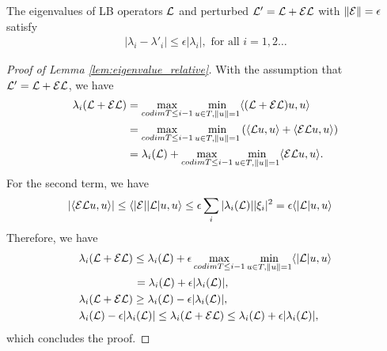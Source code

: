 \begin{lemma}\label{lem:eigenvalue_relative}
The eigenvalues of LB operators ${\mathcal L}$ and perturbed ${\mathcal L}'={\mathcal L}+{\mathcal E}{\mathcal L}$ with $\|{\mathcal E}\|= \epsilon$ satisfy
\begin{align}
    |\lambda_i-\lambda'_i|\leq \epsilon |\lambda_i|, \text{ for all }i=1,2\hdots
\end{align}
\end{lemma}
\begin{proof}[Proof of Lemma \ref{lem:eigenvalue_relative}]
With the assumption that ${\mathcal L}'={\mathcal L}+{\mathcal E}{\mathcal L}$, we have
\begin{align}
    \lambda_i({\mathcal L} + {\mathcal E}{\mathcal L})& = \max_{codim T\leq i-1} \min_{ u\in T, \|u\|=1}  \langle ({\mathcal L}+{\mathcal E}{\mathcal L}) u, u\rangle \\
    & = \max_{codim T\leq i-1} \min_{u\in T, \|u\|=1} \left(  \langle {\ensuremath{\mathcal L}} u, u\rangle   +  \langle {\ensuremath{\mathcal E}}{\ensuremath{\mathcal L}} u, u\rangle  \right)\\
    & =\lambda_i({\mathcal L}) + \max_{codim T\leq i-1} \min_{u\in T, \|u\|=1} \langle {\ensuremath{\mathcal E}}{\ensuremath{\mathcal L}} u, u\rangle.
\end{align}
For the second term, we have
\begin{align}
    |\langle {\ensuremath{\mathcal E}}{\ensuremath{\mathcal L}} u, u\rangle| &\leq \langle |{\mathcal E}|  |{\mathcal L}|u, u \rangle   \leq \epsilon \sum_i |\lambda_i({\mathcal L})||\xi_i|^2 = \epsilon \langle |{\mathcal L}| u,u \rangle
\end{align}
Therefore, we have
\begin{align}
 & \nonumber \lambda_i({\mathcal L}+{\mathcal E}{\mathcal L}) \leq \lambda_i({\mathcal L}) + \epsilon
   \max_{codim T\leq i-1} \min_{u\in T, \|u\|=1} \langle |{\mathcal L}| u, u\rangle\\
   &\qquad \qquad\quad  = \lambda_i({\mathcal L}) + \epsilon |\lambda_i({\mathcal L})|,\\
   &\lambda_i({\mathcal L} + {\mathcal E}{\mathcal L}) \geq \lambda_i({\mathcal L}) -\epsilon |\lambda_i({\mathcal L})|,\\
   &\lambda_i({\mathcal L})-\epsilon |\lambda_i({\mathcal L})|\leq  \lambda_i({\mathcal L} + {\mathcal E}{\mathcal L})\leq \lambda_i({\mathcal L}) +\epsilon|\lambda_i({\mathcal L})|,
\end{align}
which concludes the proof.
\end{proof}
\setcounter{subsection}{3}

